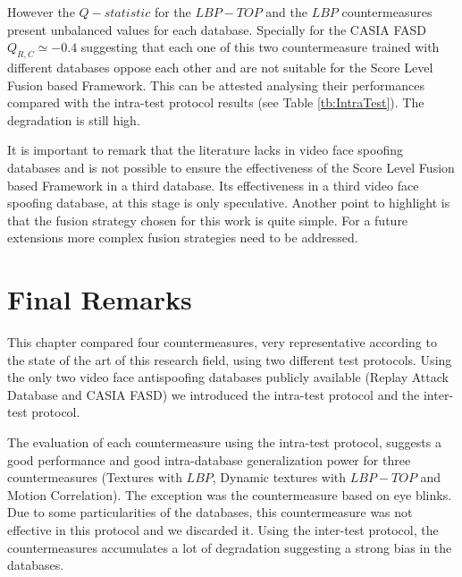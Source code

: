 However the $Q-statistic$ for the $LBP-TOP$ and the $LBP$ countermeasures present unbalanced values for each database. Specially for the CASIA FASD $Q_{R,C}\simeq-0.4$ suggesting that each one of this two countermeasure trained with different databases oppose each other and are not suitable for the Score Level Fusion based Framework. This can be attested analysing their performances compared with the intra-test protocol results (see Table \ref{tb:IntraTest}). The degradation is still high.


It is important to remark that the literature lacks in video face spoofing databases and is not possible to ensure the effectiveness of the Score Level Fusion based Framework in a third database. Its effectiveness in a third video face spoofing database, at this stage is only speculative. Another point to highlight is that the fusion strategy chosen for this work is quite simple. For a future extensions more complex fusion strategies need to be addressed.

\section{Final Remarks}
\label{sec:Experiments_finalremarks}

This chapter compared four countermeasures, very representative according to the state of the art of this research field, using two different test protocols. Using the only two video face antispoofing databases publicly available (Replay Attack Database and CASIA FASD) we introduced the intra-test protocol and the inter-test protocol.

The evaluation of each countermeasure using the intra-test protocol, suggests a good performance and good intra-database generalization power for three countermeasures (Textures with $LBP$, Dynamic textures with $LBP-TOP$  and Motion Correlation). The exception was the countermeasure based on eye blinks. Due to some particularities of the databases, this countermeasure was not effective in this protocol and we discarded it. Using the inter-test protocol, the countermeasures accumulates a lot of degradation suggesting a strong bias in the databases.

